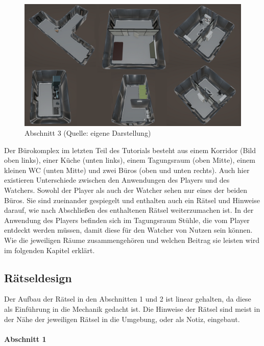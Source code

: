 \begin{figure}[ht]
\centering
\includegraphics[width=1\linewidth]{content/pictures/Abschnitt_02.png}
\caption{Abschnitt 3 (Quelle: eigene Darstellung)}
\label{fig:section_02}
\end{figure}

Der Bürokomplex im letzten Teil des Tutorials besteht aus einem Korridor (Bild oben links), einer Küche (unten links), einem Tagungsraum (oben Mitte), einem kleinen WC (unten Mitte) und zwei Büros (oben und unten rechts). Auch hier existieren Unterschiede zwischen den Anwendungen des Players und des Watchers. Sowohl der Player als auch der Watcher sehen nur eines der beiden Büros. Sie sind zueinander gespiegelt und enthalten auch ein Rätsel und Hinweise darauf, wie nach Abschließen des enthaltenen Rätsel weiterzumachen ist. In der Anwendung des Players befinden sich im Tagungsraum Stühle, die vom Player entdeckt werden müssen, damit diese für den Watcher von Nutzen sein können. Wie die jeweiligen Räume zusammengehören und welchen Beitrag sie leisten wird im folgenden Kapitel \emph{} erklärt.

\subsection{Rätseldesign}\label{sec:riddles}
Der Aufbau der Rätsel in den Abschnitten 1 und 2 ist linear gehalten, da diese als Einführung in die Mechanik gedacht ist. Die Hinweise der Rätsel sind meist in der Nähe der jeweiligen Rätsel in die Umgebung, oder als Notiz, eingebaut.

\paragraph{Abschnitt 1}

